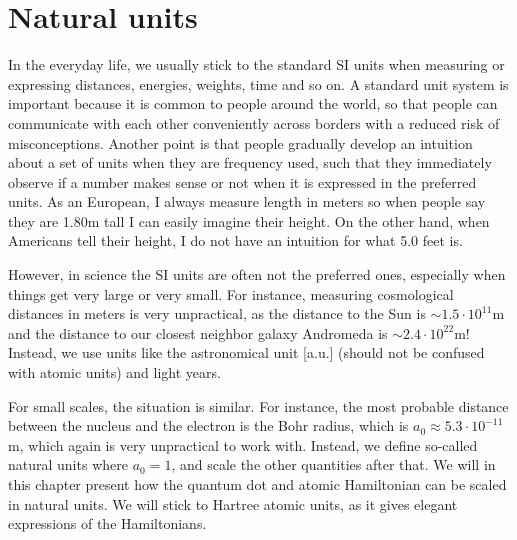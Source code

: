 \chapter{Natural units} \label{app:units}
In the everyday life, we usually stick to the standard SI units when measuring or expressing distances, energies, weights, time and so on. A standard unit system is important because it is common to people around the world, so that people can communicate with each other conveniently across borders with a reduced risk of misconceptions. Another point is that people gradually develop an intuition about a set of units when they are frequency used, such that they immediately observe if a number makes sense or not when it is expressed in the preferred units. As an European, I always measure length in meters so when people say they are 1.80m tall I can easily imagine their height. On the other hand, when Americans tell their height, I do not have an intuition for what 5.0 feet is. 

However, in science the SI units are often not the preferred ones, especially when things get very large or very small. For instance, measuring cosmological distances in meters is very unpractical, as the distance to the Sun is $\sim1.5\cdot10^{11}$m and the distance to our closest neighbor galaxy Andromeda is $\sim 2.4\cdot10^{22}$m! Instead, we use units like the astronomical unit [a.u.] (should not be confused with atomic units) and light years. 

For small scales, the situation is similar. For instance, the most probable distance between the nucleus and the electron is the Bohr radius, which is $a_0\approx5.3\cdot10^{-11}$m, which again is very unpractical to work with. Instead, we define so-called natural units where $a_0=1$, and scale the other quantities after that. We will in this chapter present how the quantum dot and atomic Hamiltonian can be scaled in natural units. We will stick to Hartree atomic units, as it gives elegant expressions of the Hamiltonians.  

